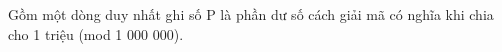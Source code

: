 Gồm một dòng duy nhất ghi số P là phần dư số cách giải mã có nghĩa khi chia cho 1 triệu (mod 1 000 000).

\